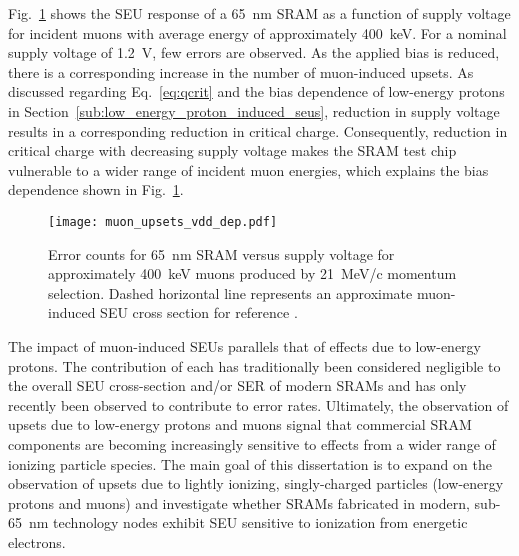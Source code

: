 Fig.~\ref{fig:muon_upsets_bias_dep} shows the SEU response of a 65~nm SRAM as a function of supply voltage for incident muons with average energy of approximately 400~keV. 
For a nominal supply voltage of 1.2~V, few errors are observed. 
As the applied bias is reduced, there is a corresponding increase in the number of muon-induced upsets. 
As discussed regarding Eq.~\ref{eq:qcrit} and the bias dependence of low-energy protons in Section~\ref{sub:low_energy_proton_induced_seus}, reduction in supply voltage results in a corresponding reduction in critical charge.
Consequently, reduction in critical charge with decreasing supply voltage makes the SRAM test chip vulnerable to a wider range of incident muon energies, which explains the bias dependence shown in Fig.~\ref{fig:muon_upsets_bias_dep}.
\begin{figure}[htbp]
    \begin{center}
        \texttt{[image: muon\_upsets\_vdd\_dep.pdf]}
    \end{center}
    \caption[Error counts for 65~nm SRAM versus supply voltage for approximately 400~keV muons produced by 21~MeV/c momentum selection. Dashed horizontal line represents an approximate muon-induced SEU cross section for reference.]{Error counts for 65~nm SRAM versus supply voltage for approximately 400~keV muons produced by 21~MeV/c momentum selection. Dashed horizontal line represents an approximate muon-induced SEU cross section for reference \cite{Sierawski:2010cj}.}
    \label{fig:muon_upsets_bias_dep}
\end{figure}

The impact of muon-induced SEUs parallels that of effects due to low-energy protons.
The contribution of each has traditionally been considered negligible to the overall SEU cross-section and/or SER of modern SRAMs and has only recently been observed to contribute to error rates.
Ultimately, the observation of upsets due to low-energy protons and muons signal that commercial SRAM components are becoming increasingly sensitive to effects from a wider range of ionizing particle species.
The main goal of this dissertation is to expand on the observation of upsets due to lightly ionizing, singly-charged particles (low-energy protons and muons) and investigate whether SRAMs fabricated in modern, sub-65~nm technology nodes exhibit SEU sensitive to ionization from energetic electrons.


